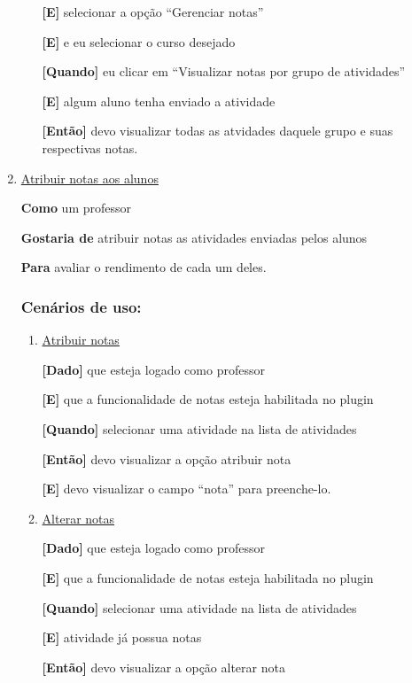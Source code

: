 \begin{enumerate}
\begin{enumerate}
\textbf{[E]} selecionar a opção ``Gerenciar notas''

\textbf{[E]} e eu selecionar o curso desejado

\textbf{[Quando]} eu clicar em ``Visualizar notas por grupo de atividades''

\textbf{[E]} algum aluno tenha enviado a atividade

\textbf{[Então]} devo visualizar todas as atvidades daquele grupo e suas respectivas notas.

\end{enumerate}

\item \underline{Atribuir notas aos alunos}

\textbf{Como} um professor

\textbf{Gostaria de} atribuir notas as atividades enviadas pelos alunos

\textbf{Para} avaliar o rendimento de cada um deles.

\subsubsection*{Cenários de uso:}

\begin{enumerate}
\item \underline{Atribuir notas}

\textbf{[Dado]} que esteja logado como professor

\textbf{[E]} que a funcionalidade de notas esteja habilitada no plugin

\textbf{[Quando]} selecionar uma atividade na lista de atividades

\textbf{[Então]} devo visualizar a opção atribuir nota

\textbf{[E]} devo visualizar o campo ``nota'' para preenche-lo.


\item \underline{Alterar notas}

\textbf{[Dado]} que esteja logado como professor

\textbf{[E]} que a funcionalidade de notas esteja habilitada no plugin

\textbf{[Quando]} selecionar uma atividade na lista de atividades

\textbf{[E]} atividade já possua notas

\textbf{[Então]} devo visualizar a opção alterar nota


\end{enumerate}
\end{enumerate}
